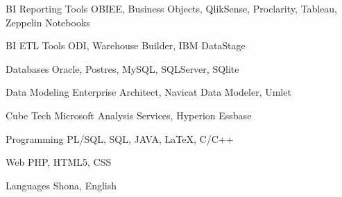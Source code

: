 


\begin{cvskills}

\cvskill
{BI Reporting Tools} %
{OBIEE, Business Objects, QlikSense, Proclarity, Tableau, Zeppelin Notebooks}

\cvskill
{BI ETL Tools} %
{ODI, Warehouse Builder, IBM DataStage}

\cvskill
{Databases} %
{Oracle,  Postres, MySQL, SQLServer, SQlite}

\cvskill
{Data Modeling} %
{Enterprise Architect,  Navicat Data Modeler, Umlet}

\cvskill
{Cube Tech} %
{Microsoft Analysis Services, Hyperion Essbase}

\cvskill
{Programming} %
{PL/SQL, SQL, JAVA, LaTeX, C/C++} %


\cvskill
{Web} %
{PHP, HTML5, CSS} %


\cvskill
{Languages} %
{Shona, English} %


\end{cvskills}